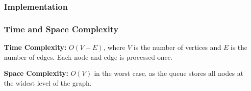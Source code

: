 \subsubsection{Implementation}

\subsubsection{Time and Space Complexity}
\textbf{Time Complexity:} $O(V + E)$, where $V$ is the number of vertices and $E$ is the number of edges. Each node and edge is processed once.

\textbf{Space Complexity:} $O(V)$ in the worst case, as the queue stores all nodes at the widest level of the graph.



